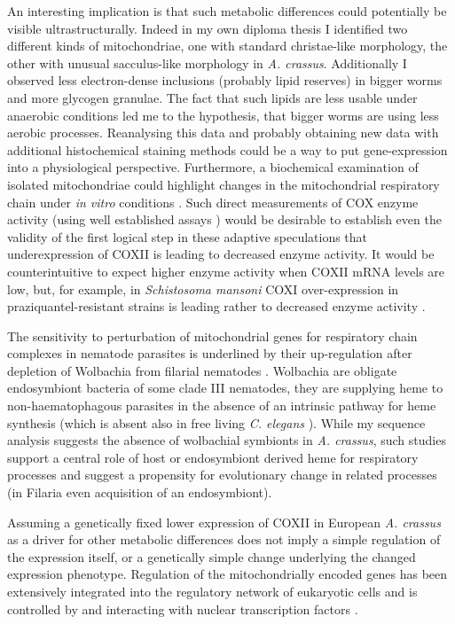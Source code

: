 An interesting implication is that such metabolic differences could
potentially be visible ultrastructurally. Indeed in my own diploma
thesis \cite{heitlinger_vergleichende_2008} I identified two different
kinds of mitochondriae, one with standard christae-like morphology,
the other with unusual sacculus-like morphology in
\textit{A. crassus}. Additionally I observed less electron-dense
inclusions (probably lipid reserves) in bigger worms and more glycogen
granulae. The fact that such lipids are less usable under anaerobic
conditions led me to the hypothesis, that bigger worms are using less
aerobic processes. Reanalysing this data and probably obtaining new
data with additional histochemical staining methods could be a way to
put gene-expression into a physiological perspective. Furthermore, a
biochemical examination of isolated mitochondriae could highlight
changes in the mitochondrial respiratory chain under \textit{in vitro}
conditions \cite{pmid18314717}. Such direct measurements of COX enzyme
activity (using well established assays \cite{pmid8592440}) would be
desirable to establish even the validity of the first logical step in
these adaptive speculations that underexpression of COXII is leading
to decreased enzyme activity. It would be counterintuitive to expect
higher enzyme activity when COXII mRNA levels are low, but, for
example, in \textit{Schistosoma mansoni} COXI over-expression in
praziquantel-resistant strains is leading rather to decreased enzyme
activity \cite{pmid9695101}.

The sensitivity to perturbation of mitochondrial genes for respiratory
chain complexes in nematode parasites is underlined by their
up-regulation after depletion of Wolbachia from filarial nematodes
\cite{pmid20362581, pmid19806204}. Wolbachia are obligate endosymbiont
bacteria of some clade III nematodes, they are supplying heme to
non-haematophagous parasites in the absence of an intrinsic pathway
for heme synthesis \cite{ghedin_draft_2007} (which is absent also in
free living \textit{C. elegans} \cite{pmid15767563}). While my
sequence analysis suggests the absence of wolbachial symbionts in
\textit{A. crassus}, such studies support a central role of host or
endosymbiont derived heme for respiratory processes and suggest a
propensity for evolutionary change in related processes (in Filaria
even acquisition of an endosymbiont).

Assuming a genetically fixed lower expression of COXII in European
\textit{A. crassus} as a driver for other metabolic differences does
not imply a simple regulation of the expression itself, or a
genetically simple change underlying the changed expression
phenotype. Regulation of the mitochondrially encoded genes has been
extensively integrated into the regulatory network of eukaryotic
cells and is controlled by and interacting with nuclear transcription
factors \cite{pmid8289797}.

